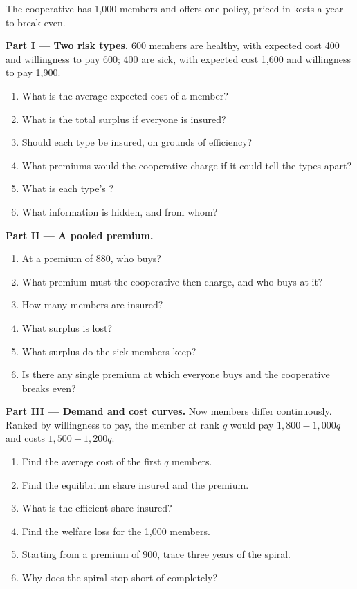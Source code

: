 \begin{problem}
\label{pb:b2:adverse-selection:1}
The cooperative has 1{,}000 members and offers one policy, priced in kests a year to break even.

\medskip
\noindent\textbf{Part I --- Two risk types.} 600 members are healthy, with expected cost 400 and willingness to pay 600; 400 are
sick, with expected cost 1{,}600 and willingness to pay 1{,}900.
\begin{enumerate}
  \item What is the average expected cost of a member?
  \item What is the total surplus if everyone is insured?
  \item Should each type be insured, on grounds of efficiency?
  \item What premiums would the cooperative charge if it could tell the types apart?
  \item What is each type's ?
  \item What information is hidden, and from whom?
\end{enumerate}

\medskip
\noindent\textbf{Part II --- A pooled premium.}
\begin{enumerate}[resume]
  \item At a premium of 880, who buys?
  \item What premium must the cooperative then charge, and who buys at it?
  \item How many members are insured?
  \item What surplus is lost?
  \item What surplus do the sick members keep?
  \item Is there any single premium at which everyone buys and the cooperative breaks even?
\end{enumerate}

\medskip
\noindent\textbf{Part III --- Demand and cost curves.} Now members differ continuously. Ranked by willingness to pay, the
member at rank $q$ would pay $1{,}800 - 1{,}000q$ and costs $1{,}500 - 1{,}200q$.
\begin{enumerate}[resume]
  \item Find the average cost of the first $q$ members.
  \item Find the equilibrium share insured and the premium.
  \item What is the efficient share insured?
  \item Find the welfare loss for the 1{,}000 members.
  \item Starting from a premium of 900, trace three years of the spiral.
  \item Why does the spiral stop short of  completely?
\end{enumerate}


\end{problem}

